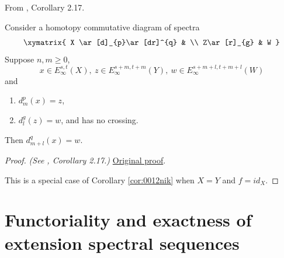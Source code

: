 \begin{corollary}
\label{paper:2.17}
From \cite{LWX126}, Corollary 2.17.\par
\label{cor:290d35ce}
    Consider a homotopy commutative diagram of spectra
    $$\xymatrix{
    X \ar[d]_{p}\ar[dr]^{q} & \\
    Z\ar[r]_{g} & W
    }$$
    Suppose $n,m\ge 0$, 
    $$x\in E^{s,t}_\infty(X), ~z\in E^{s+m,t+m}_\infty(Y), ~w\in E^{s+m+l,t+m+l}_\infty(W)$$
    and
    \begin{enumerate}
        \item $d^{p}_{m}(x)=z$,
        \item $d^{g}_{l}(z)=w$, and has no crossing.
    \end{enumerate}
    Then $d^{q}_{m+l}(x)=w$.



\end{corollary}
\begin{proof}
\textit{(See \cite{LWX126}, Corollary 2.17.)} \href{paper/main.tex.html#L613}{Original proof}.

This is a special case of Corollary \ref{cor:0012nik} when $X=Y$ and $f=id_X$.
\end{proof}

\section{Functoriality and exactness of extension spectral sequences}

